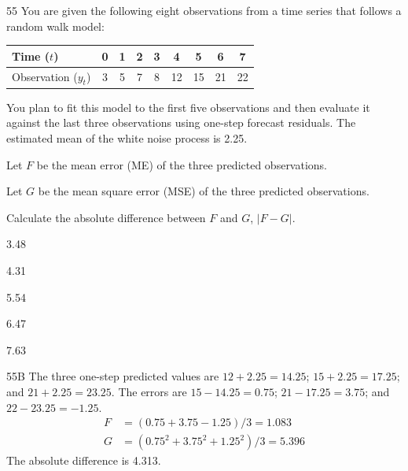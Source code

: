 \begin{question}{55}
You are given the following eight observations from a time series that follows a random walk model:

\begin{center}
\begin{tabular}{|l|c|c|c|c|c|c|c|c|}
\hline
Time ($t$) & 0 & 1 & 2 & 3 & 4 & 5 & 6 & 7 \\ \hline
Observation ($y_t$) & 3 & 5 & 7 & 8 & 12 & 15 & 21 & 22 \\ \hline
\end{tabular}
\end{center}

You plan to fit this model to the first five observations and then evaluate it against the last three observations using one-step forecast residuals. The estimated mean of the white noise process is 2.25.

Let $F$ be the mean error (ME) of the three predicted observations.

Let $G$ be the mean square error (MSE) of the three predicted observations.

Calculate the absolute difference between $F$ and $G$, $|F - G|$.

\begin{choices}
\item 3.48
\item 4.31
\item 5.54
\item 6.47
\item 7.63
\end{choices}
\end{question}
\begin{solution}{55}{B}
The three one-step predicted values are $12+2.25 = 14.25$; $15+2.25 = 17.25$; and $21+2.25 = 23.25$. The errors are $15 - 14.25 = 0.75$; $21 - 17.25 = 3.75$; and $22 - 23.25 = -1.25$.
\begin{align*}
F &= (0.75 + 3.75 - 1.25)/3 = 1.083 \\
G &= (0.75^2 + 3.75^2 + 1.25^2)/3 = 5.396
\end{align*}
The absolute difference is 4.313.
\end{solution}

